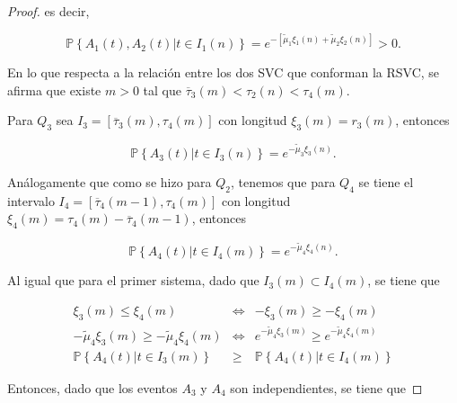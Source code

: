 \documentclass{article}
\newcommand{\prob}{\mathbb{P}}
\numberwithin{equation}{section}
\begin{document}
\begin{proof}
es decir, 

\begin{equation}
\prob\left\{A_{1}\left(t\right),A_{2}\left(t\right)|t\in I_{1}\left(n\right)\right\}
=e^{-\left[\tilde{\mu}_{1}\xi_{1}\left(n\right)+\tilde{\mu}_{2}\xi_{2}
\left(n\right)\right]}>0.
\end{equation}

En lo que respecta a la relaci\'on entre los dos SVC que conforman la RSVC, se afirma que existe $m>0$ tal que $\overline{\tau}_{3}\left(m\right)<\tau_{2}\left(n\right)<\tau_{4}\left(m\right)$.

Para $Q_{3}$ sea $I_{3}=\left[\overline{\tau}_{3}\left(m\right),\tau_{4}\left(m\right)\right]$ con longitud  $\xi_{3}\left(m\right)=r_{3}\left(m\right)$, entonces 

\begin{equation}
\prob\left\{A_{3}\left(t\right)|t\in I_{3}\left(n\right)\right\}=e^{-\tilde{\mu}_{3}\xi_{3}\left(n\right)}.
\end{equation} 

An\'alogamente que como se hizo para $Q_{2}$, tenemos que para $Q_{4}$ se tiene el intervalo $I_{4}=\left[\overline{\tau}_{4}\left(m-1\right),\tau_{4}\left(m\right)\right]$ con longitud $\xi_{4}\left(m\right)=\tau_{4}\left(m\right)-\overline{\tau}_{4}\left(m-1\right)$, entonces


\begin{equation}
\prob\left\{A_{4}\left(t\right)|t\in I_{4}\left(m\right)\right\}=e^{-\tilde{\mu}_{4}\xi_{4}\left(n\right)}.
\end{equation} 

Al igual que para el primer sistema, dado que $I_{3}\left(m\right)\subset I_{4}\left(m\right)$, se tiene que

\begin{eqnarray*}
\xi_{3}\left(m\right)\leq\xi_{4}\left(m\right)&\Leftrightarrow& -\xi_{3}\left(m\right)\geq-\xi_{4}\left(m\right)
\\
-\tilde{\mu}_{4}\xi_{3}\left(m\right)\geq-\tilde{\mu}_{4}\xi_{4}\left(m\right)&\Leftrightarrow&
e^{-\tilde{\mu}_{4}\xi_{3}\left(m\right)}\geq e^{-\tilde{\mu}_{4}\xi_{4}\left(m\right)}\\
\prob\left\{A_{4}\left(t\right)|t\in I_{3}\left(m\right)\right\}&\geq&
\prob\left\{A_{4}\left(t\right)|t\in I_{4}\left(m\right)\right\}
\end{eqnarray*}

Entonces, dado que los eventos $A_{3}$ y $A_{4}$ son independientes, se tiene que


\end{proof}
\end{document}
